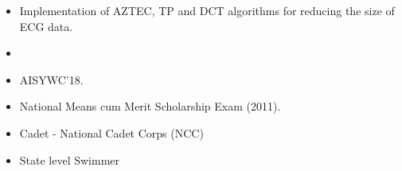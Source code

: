 \begin{itemize}
\item Implementation of AZTEC, TP and DCT algorithms for reducing the size of ECG data.
\smallskip
\item {}
\smallskip\smallskip
\end{itemize}



\begin{itemize}
\item AISYWC'18.
\end{itemize}

\begin{itemize}
\item National Means cum Merit Scholarship Exam (2011).
\end{itemize}


\begin{itemize}
\item Cadet - National Cadet Corps (NCC)
\item State level Swimmer
\end{itemize}
